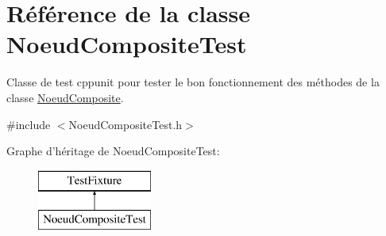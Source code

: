 \hypertarget{class_noeud_composite_test}{\section{Référence de la classe Noeud\-Composite\-Test}
\label{class_noeud_composite_test}
}


Classe de test cppunit pour tester le bon fonctionnement des méthodes de la classe \hyperlink{class_noeud_composite}{Noeud\-Composite}.  




{\ttfamily \#include $<$Noeud\-Composite\-Test.\-h$>$}

Graphe d'héritage de Noeud\-Composite\-Test\-:\begin{figure}[H]
\begin{center}
\leavevmode
\includegraphics[height=2.000000cm]{class_noeud_composite_test}
\end{center}
\end{figure}
